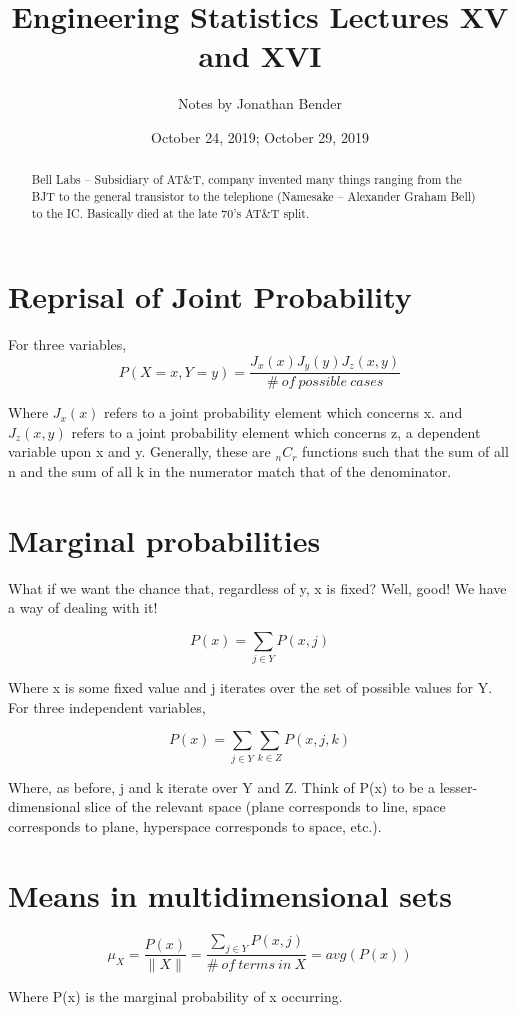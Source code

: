 \documentclass[]{article}
\title{Engineering Statistics Lectures XV and XVI}
\author{Notes by Jonathan Bender}
\date{October 24, 2019; October 29, 2019}
\begin{document}
	
	\maketitle
	
	\begin{abstract}
		Bell Labs -- Subsidiary of AT\&T, company invented many things ranging from the BJT to the general transistor to the telephone (Namesake -- Alexander Graham Bell) to the IC. Basically died at the late 70's AT\&T split.
	\end{abstract}
	
	\section{Reprisal of Joint Probability}
		For three variables, $$P(X=x, Y=y) = \dfrac{J_x(x)J_y(y)J_z(x,y)}{\#\ of\ possible\ cases}$$
		
		Where $J_x(x)$ refers to a joint probability element which concerns x. and $J_z(x,y)$ refers to a joint probability element which concerns z, a dependent variable upon x and y.
		Generally, these are $_nC_r$ functions such that the sum of all n and the sum of all k in the numerator match that of the denominator.
	
	\section{Marginal probabilities}
		What if we want the chance that, regardless of y, x is fixed?
		Well, good! We have a way of dealing with it!
		
		$$P(x) = \sum_{j \in Y}P(x,j)$$
		
		Where x is some fixed value and j iterates over the set of possible values for Y.
		For three independent variables,
		
		$$P(x) = \sum_{j \in Y}\sum_{k \in Z}P(x,j,k)$$
		
		Where, as before, j and k iterate over Y and Z. Think of P(x) to be a lesser-dimensional slice of the relevant space (plane corresponds to line, space corresponds to plane, hyperspace corresponds to space, etc.).
	
	\section{Means in multidimensional sets}
		$$\mu_X = \frac{P(x)}{\|X\|} = \dfrac{\sum_{j \in Y}P(x,j)}{\#\ of\ terms\ in\ X} = avg(P(x))$$
		
		Where P(x) is the marginal probability of x occurring.
	
\end{document}
